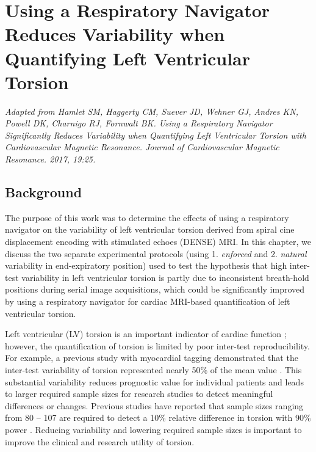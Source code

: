 \chapter{Using a Respiratory Navigator Reduces Variability when Quantifying Left Ventricular Torsion}

\begin{center}
\textit{Adapted from Hamlet SM, Haggerty CM, Suever JD, Wehner GJ, Andres KN, Powell DK, Charnigo RJ, Fornwalt BK. Using a Respiratory Navigator Significantly Reduces Variability when Quantifying Left Ventricular Torsion with Cardiovascular Magnetic Resonance. Journal of Cardiovascular Magnetic Resonance. 2017, 19:25.}
\end{center}

\section{Background}
	The purpose of this work was to determine the effects of using a respiratory navigator on the variability of left ventricular torsion derived from spiral cine displacement encoding with stimulated echoes (DENSE) MRI. In this chapter, we discuss the two separate experimental protocols (using 1. \textit{enforced} and 2. \textit{natural} variability in end-expiratory position) used to test the hypothesis that high inter-test variability in left ventricular torsion is partly due to inconsistent breath-hold positions during serial image acquisitions, which could be significantly improved by using a respiratory navigator for cardiac MRI-based quantification of left ventricular torsion.

	Left ventricular (LV) torsion is an important indicator of cardiac function \cite{Russel2011b,Gotte2006a}; however, the quantification of torsion is limited by poor inter-test reproducibility. For example, a previous study with myocardial tagging demonstrated that the inter-test variability of torsion represented nearly 50\% of the mean value \cite{Donekal2013a}. This substantial variability reduces prognostic value for individual patients and leads to larger required sample sizes for research studies to detect meaningful differences or changes. Previous studies have reported that sample sizes ranging from 80 – 107 are required to detect a 10\% relative difference in torsion with 90\% power \cite{Donekal2013a,Kowallick2016,Kaku2014a}. Reducing variability and lowering required sample sizes is important to improve the clinical and research utility of torsion.
	
